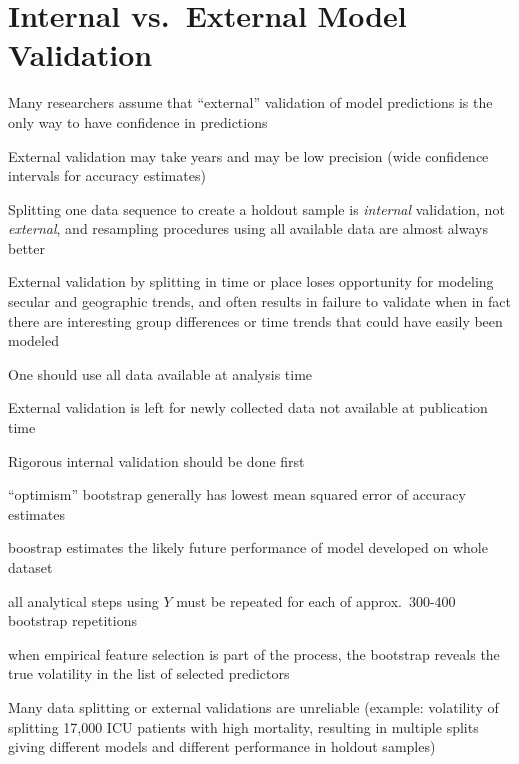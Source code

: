 \section{Internal vs.\ External Model Validation}

\bi
\item Many researchers assume that ``external'' validation of model
  predictions is the only way to have confidence in predictions
\item External validation may take years and may be low precision
  (wide confidence intervals for accuracy estimates)
\item Splitting one data sequence to create a holdout sample is
  \emph{internal} validation, not \emph{external}, and resampling
  procedures using all available data are almost always better
\item External validation by splitting in time or place loses
  opportunity for modeling secular and geographic trends, and often
  results in failure to validate when in fact there are interesting
  group differences or time trends that could have easily been modeled
\item One should use all data available at analysis time\ipacue
\item External validation is left for newly collected data not
  available at publication time
\item Rigorous internal validation should be done first
  \bi
  \item ``optimism'' bootstrap generally has lowest mean squared error
    of accuracy estimates
  \item boostrap estimates the likely future performance of model
    developed on whole dataset
  \item all analytical steps using $Y$ must be repeated for each of
    approx.\ 300-400 bootstrap repetitions
  \item when empirical feature selection is part of the process, the bootstrap
    reveals the true volatility in the list of selected predictors
  \ei
\item Many data splitting or external validations are unreliable \ipacue
  (example: volatility of splitting 17,000 ICU patients with high
  mortality, resulting in multiple splits giving different models and
  different performance in holdout samples)
\ei

